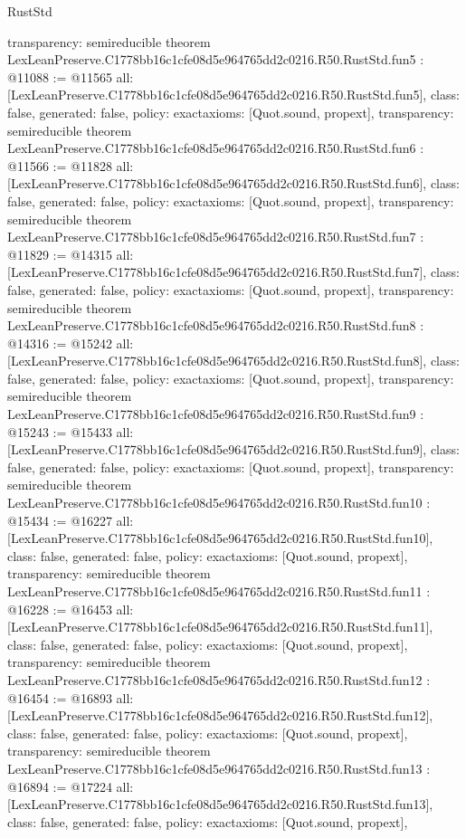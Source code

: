 \begin{lexlean}{RustStd}
\begin{coremodule}
{  transparency: semireducible
}
theorem LexLeanPreserve.C1778bb16c1cfe08d5e964765dd2c0216.R50.RustStd.fun5 : @11088 := @11565 {
  all: [LexLeanPreserve.C1778bb16c1cfe08d5e964765dd2c0216.R50.RustStd.fun5],
  class: false,
  generated: false,
  policy: exact{axioms: [Quot.sound, propext]},
  transparency: semireducible
}
theorem LexLeanPreserve.C1778bb16c1cfe08d5e964765dd2c0216.R50.RustStd.fun6 : @11566 := @11828 {
  all: [LexLeanPreserve.C1778bb16c1cfe08d5e964765dd2c0216.R50.RustStd.fun6],
  class: false,
  generated: false,
  policy: exact{axioms: [Quot.sound, propext]},
  transparency: semireducible
}
theorem LexLeanPreserve.C1778bb16c1cfe08d5e964765dd2c0216.R50.RustStd.fun7 : @11829 := @14315 {
  all: [LexLeanPreserve.C1778bb16c1cfe08d5e964765dd2c0216.R50.RustStd.fun7],
  class: false,
  generated: false,
  policy: exact{axioms: [Quot.sound, propext]},
  transparency: semireducible
}
theorem LexLeanPreserve.C1778bb16c1cfe08d5e964765dd2c0216.R50.RustStd.fun8 : @14316 := @15242 {
  all: [LexLeanPreserve.C1778bb16c1cfe08d5e964765dd2c0216.R50.RustStd.fun8],
  class: false,
  generated: false,
  policy: exact{axioms: [Quot.sound, propext]},
  transparency: semireducible
}
theorem LexLeanPreserve.C1778bb16c1cfe08d5e964765dd2c0216.R50.RustStd.fun9 : @15243 := @15433 {
  all: [LexLeanPreserve.C1778bb16c1cfe08d5e964765dd2c0216.R50.RustStd.fun9],
  class: false,
  generated: false,
  policy: exact{axioms: [Quot.sound, propext]},
  transparency: semireducible
}
theorem LexLeanPreserve.C1778bb16c1cfe08d5e964765dd2c0216.R50.RustStd.fun10 : @15434 := @16227 {
  all: [LexLeanPreserve.C1778bb16c1cfe08d5e964765dd2c0216.R50.RustStd.fun10],
  class: false,
  generated: false,
  policy: exact{axioms: [Quot.sound, propext]},
  transparency: semireducible
}
theorem LexLeanPreserve.C1778bb16c1cfe08d5e964765dd2c0216.R50.RustStd.fun11 : @16228 := @16453 {
  all: [LexLeanPreserve.C1778bb16c1cfe08d5e964765dd2c0216.R50.RustStd.fun11],
  class: false,
  generated: false,
  policy: exact{axioms: [Quot.sound, propext]},
  transparency: semireducible
}
theorem LexLeanPreserve.C1778bb16c1cfe08d5e964765dd2c0216.R50.RustStd.fun12 : @16454 := @16893 {
  all: [LexLeanPreserve.C1778bb16c1cfe08d5e964765dd2c0216.R50.RustStd.fun12],
  class: false,
  generated: false,
  policy: exact{axioms: [Quot.sound, propext]},
  transparency: semireducible
}
theorem LexLeanPreserve.C1778bb16c1cfe08d5e964765dd2c0216.R50.RustStd.fun13 : @16894 := @17224 {
  all: [LexLeanPreserve.C1778bb16c1cfe08d5e964765dd2c0216.R50.RustStd.fun13],
  class: false,
  generated: false,
  policy: exact{axioms: [Quot.sound, propext]},
}
\end{coremodule}
\end{lexlean}
